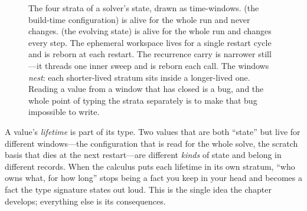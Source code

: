 \begin{figure}[t]
\centering
{}
\caption[The four strata as nested lifetimes]{The four strata of a solver's
state, drawn as time-windows.  (the build-time configuration) is
alive for the whole run and never changes.  (the evolving state)
is alive for the whole run and changes every step. The ephemeral 
workspace lives for a single restart cycle and is reborn at each restart. The
recurrence carry is narrower still---it threads one inner sweep and is reborn
each call. The windows \emph{nest}: each shorter-lived stratum sits inside a
longer-lived one. Reading a value from a window that has closed is a bug, and the
whole point of typing the strata separately is to make that bug impossible to
write.}
\label{fig:nested}
\end{figure}

\begin{keyidea}
A value's \emph{lifetime} is part of its type. Two values that are both
``state'' but live for different windows---the configuration that is read for the
whole solve, the scratch basis that dies at the next restart---are different
\emph{kinds} of state and belong in different records. When the calculus puts
each lifetime in its own stratum, ``who owns what, for how long'' stops being a
fact you keep in your head and becomes a fact the type signature states out
loud. This is the single idea the chapter develops; everything else is its
consequences.
\end{keyidea}

